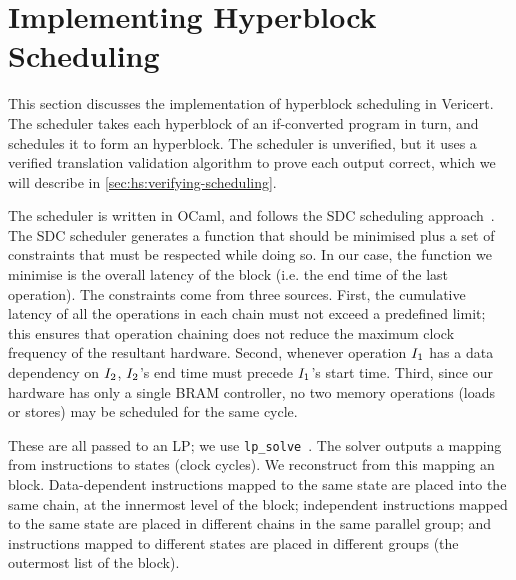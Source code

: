 \section{Implementing Hyperblock Scheduling}
\label{sec:hs:implementing-scheduling}

This section discusses the implementation of hyperblock scheduling in Vericert.
The scheduler takes each hyperblock of an if-converted \rtlblock{} program in
turn, and schedules it to form an \rtlpar{} hyperblock. The scheduler is
unverified, but it uses a verified translation validation algorithm to prove
each output correct, which we will describe in
\cref{sec:hs:verifying-scheduling}.

The scheduler is written in OCaml, and follows the SDC scheduling
approach~\cite{cong06_sdc}.  The SDC scheduler generates a function that should
be minimised plus a set of constraints that must be respected while doing so. In
our case, the function we minimise is the overall latency of the block (i.e. the
end time of the last
operation).
The constraints come from three sources. First, the cumulative latency of all
the operations in each chain must not exceed a predefined limit; this ensures
that operation chaining does not reduce the maximum clock frequency of the
resultant hardware. Second, whenever operation $I_1$ has a data dependency
on $I_2$, $I_2$'s end time must precede $I_1$'s start
time. Third, since our hardware has only a single \gls{BRAM} controller, no two
memory operations (loads or stores) may be scheduled for the same cycle.

These are all passed to an \gls{LP}; we use
\texttt{lp\_solve}~\cite{berkelaar10}.  The solver outputs a mapping from
instructions to states (clock cycles). We reconstruct from this mapping an
\rtlpar{} block. Data-dependent instructions mapped to the same state are placed
into the same chain, at the innermost level of the \rtlpar{} block; independent
instructions mapped to the same state are placed in different chains in the same
parallel group; and instructions mapped to different states are placed in
different groups (the outermost list of the \rtlpar{} block).

